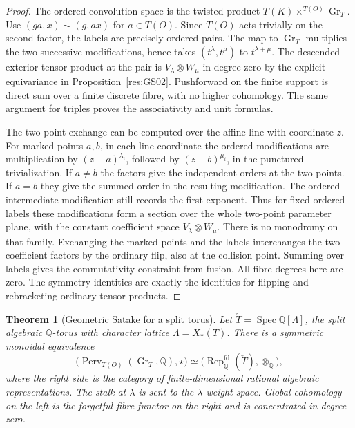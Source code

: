 \documentclass[11pt,oneside,openany]{book}
\newtheorem{theorem}{Theorem}[chapter]
\theoremstyle{definition}
\theoremstyle{remark}
\begin{document}
\begin{proof}
The ordered convolution space is the twisted product
\(T(K)\times^{T(O)}\operatorname{Gr}_T\).
Use \((ga,x)\sim(g,ax)\) for \(a\in T(O)\).
Since \(T(O)\) acts trivially on the second factor, the labels
are precisely ordered pairs. The map to \(\operatorname{Gr}_T\)
multiplies the two successive modifications, hence takes
\((t^\lambda,t^\mu)\) to \(t^{\lambda+\mu}\).
The descended exterior tensor product at the pair is
\(V_\lambda\otimes W_\mu\) in degree zero by the explicit
equivariance in Proposition~\ref{res:GS02}.
Pushforward on the finite support is direct sum over a finite
discrete fibre, with no higher cohomology. The same argument
for triples proves the associativity and unit formulas.

The two-point exchange can be computed over the affine line
with coordinate \(z\). For marked points \(a,b\), in each line
coordinate the ordered modifications are multiplication by
\((z-a)^{\lambda_i}\), followed by
\((z-b)^{\mu_i}\), in the punctured trivialization.
If \(a\ne b\) the factors give the independent orders at the two
points. If \(a=b\) they give the summed order in the resulting
modification. The ordered intermediate modification still records
the first exponent. Thus for fixed ordered labels these
modifications form a section over the whole two-point parameter
plane, with the constant coefficient space
\(V_\lambda\otimes W_\mu\). There is no monodromy on that family.
Exchanging the marked points and the labels interchanges the two
coefficient factors by the ordinary flip, also at the collision
point. Summing over labels gives the commutativity constraint
from fusion. All fibre degrees here are zero.
The symmetry identities are exactly the identities for flipping
and rebracketing ordinary tensor products.
\end{proof}

\begin{theorem}[Geometric Satake for a split torus]
\label{res:GS04}
Let \(\check T=\operatorname{Spec}\mathbb Q[\Lambda]\), the
split algebraic \(\mathbb Q\)-torus with character lattice
\(\Lambda=X_*(T)\). There is a symmetric monoidal equivalence
\[
 \bigl(\operatorname{Perv}_{T(O)}(\operatorname{Gr}_T,\mathbb Q),
          \star\bigr)
  \simeq
  \bigl(\operatorname{Rep}_{\mathbb Q}^{\mathrm{fd}}(\check T),
          \otimes_{\mathbb Q}\bigr),
\]
where the right side is the category of finite-dimensional rational
algebraic representations. The stalk at \(\lambda\) is sent
to the \(\lambda\)-weight space. Global cohomology on the left
is the forgetful fibre functor on the right and is concentrated
in degree zero.
\end{theorem}
\end{document}
